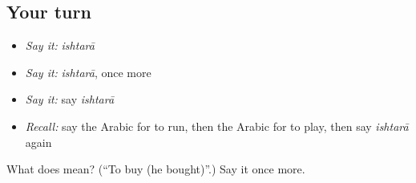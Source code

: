\subsection*{Your turn}
\begin{itemize}
\raggedright
  \item \emph{Say it:} \emph{ishtarā}
  \item \emph{Say it:} \emph{ishtarā}, once more
  \item \emph{Say it:} say \emph{ishtarā}
  \item \emph{Recall:} say the Arabic for to run, then the Arabic for to play, then say \emph{ishtarā} again
\end{itemize}

\begin{tcolorbox}[breakable,colback=teal!4,colframe=teal!35!black,title={Before you move on}]
What does  mean? (\textquotedblleft{}To buy (he bought)\textquotedblright{}.) Say it once more.
\end{tcolorbox}
